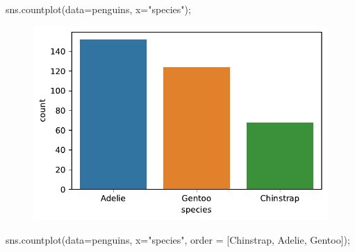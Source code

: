 \documentclass[
  a4paper,
  noprof,
  12pt,
  notoc,
  nosols,
  nobib]{mnye}
\newenvironment{Shaded}{\begin{snugshade}}{\end{snugshade}}
\newcommand{\NormalTok}[1]{\textcolor[rgb]{0.00,0.23,0.31}{#1}}
\newcommand{\OperatorTok}[1]{\textcolor[rgb]{0.37,0.37,0.37}{#1}}
\newcommand{\StringTok}[1]{\textcolor[rgb]{0.13,0.47,0.30}{#1}}
\theoremstyle{definition}
\theoremstyle{remark}
\begin{document}
\begin{Shaded}
\begin{Highlighting}[]
\NormalTok{sns.countplot(data}\OperatorTok{=}\NormalTok{penguins, x}\OperatorTok{=}\StringTok{"species"}\NormalTok{)}\OperatorTok{;}
\end{Highlighting}
\end{Shaded}

\begin{figure}[tbph]

{\centering \includegraphics{chapters/1categorical_files/figure-pdf/cell-13-output-1.pdf}

}

\end{figure}

\begin{Shaded}
\begin{Highlighting}[]
\NormalTok{sns.countplot(data}\OperatorTok{=}\NormalTok{penguins, x}\OperatorTok{=}\StringTok{"species"}\NormalTok{, order }\OperatorTok{=}\NormalTok{ [}\StringTok{\textquotesingle{}Chinstrap\textquotesingle{}}\NormalTok{, }\StringTok{\textquotesingle{}Adelie\textquotesingle{}}\NormalTok{, }\StringTok{\textquotesingle{}Gentoo\textquotesingle{}}\NormalTok{])}\OperatorTok{;}
\end{Highlighting}
\end{Shaded}
\end{document}
